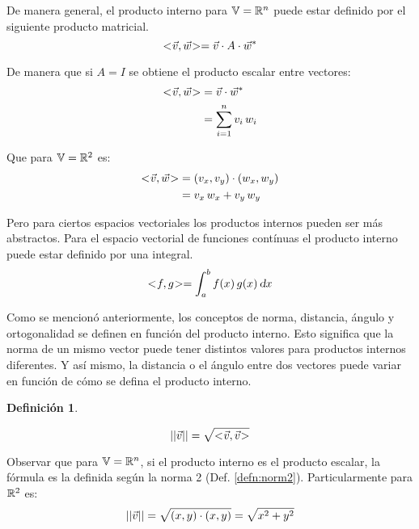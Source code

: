 \documentclass[a5paper,12pt,twoside]{book}
\newtheorem{defn}{{Definición}}[chapter]
\begin{document}
De manera general, el producto interno para $\mathbb{V} = \mathbb{R}^n$ puede estar definido por el siguiente producto matricial.
\begin{equation*}
    <\hspace{-0.8mm}\Vec{v},\Vec{w}\hspace{-0.8mm}> = \Vec{v} \cdot A \cdot \Vec{w}^*
\end{equation*}

De manera que si $A=I$ se obtiene el producto escalar entre vectores:
\begin{align*}
    <\hspace{-0.8mm}\Vec{v},\Vec{w}\hspace{-0.8mm}> &= \Vec{v} \cdot \Vec{w}^*
    \\
    &= \sum_{i=1}^n v_i \, w_i
\end{align*}

Que para $\mathbb{V} = \mathbb{R}^2$ es:
\begin{align*}
    <\hspace{-0.8mm}\Vec{v},\Vec{w}\hspace{-0.8mm}> &= (v_x,v_y) \cdot (w_x,w_y)
    \\
    &= v_x \, w_x + v_y \, w_y
\end{align*}

Pero para ciertos espacios vectoriales los productos internos pueden ser más abstractos. Para el espacio vectorial de funciones contínuas el producto interno puede estar definido por una integral.
\begin{equation*}
    <\hspace{-0.8mm}f,g\hspace{-0.8mm}> = \int_a^b f(x) \, g(x) \, \textsl{d} x
\end{equation*}

Como se mencionó anteriormente, los conceptos de norma, distancia, ángulo y ortogonalidad se definen en función del producto interno. Esto significa que la norma de un mismo vector puede tener distintos valores para productos internos diferentes. Y así mismo, la distancia o el ángulo entre dos vectores puede variar en función de cómo se defina el producto interno.

\begin{mdframed}[style=MyFrame1]
    \begin{defn}
    \end{defn}
    \begin{equation*}
        {\left|\left| {\Vec{v}} \right|\right|} = \sqrt{<\hspace{-0.8mm}\Vec{v},\Vec{v}\hspace{-0.8mm}>}
    \end{equation*}
\end{mdframed}

Observar que para $\mathbb{V} = \mathbb{R}^n$, si el producto interno es el producto escalar, la fórmula es la definida según la norma 2 (Def. \ref{defn:norm2}). Particularmente para $\mathbb{R}^2$ es:
\begin{equation*}
    {\left|\left| {\Vec{v}} \right|\right|} = \sqrt{(x,y) \cdot (x,y)} = \sqrt{x^2+y^2}
\end{equation*}
\end{document}

